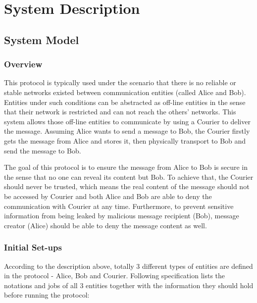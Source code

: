 \chapter{System Description}
\section{System Model}
\subsection{Overview}
This protocol is typically used under the scenario that there is no reliable or stable networks existed between communication entities (called Alice and Bob). Entities under such conditions can be abstracted as off-line entities in the sense that their network is restricted and can not reach the others' networks. This system allows those off-line entities to communicate by using a Courier to deliver the message. Assuming Alice wants to send a message to Bob, the Courier firstly gets the message from Alice and stores it, then physically transport to Bob and send the message to Bob. \par
The goal of this protocol is to ensure the message from Alice to Bob is secure in the sense that no one can reveal its content but Bob. To achieve that, the Courier should never be trusted, which means the real content of the message should not be accessed by Courier and both Alice and Bob are able to deny the communication with Courier at any time. Furthermore, to prevent sensitive information from being leaked by malicious message recipient (Bob), message creator (Alice) should be able to deny the message content as well.

\subsection{Initial Set-ups}
According to the description above, totally 3 different types of entities are defined in the protocol - Alice, Bob and Courier. Following specification lists the notations and jobs of all 3 entities together with the information they should hold before running the protocol:

